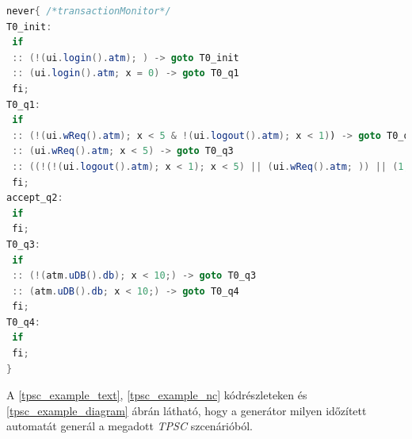 \begin{lstlisting}[language=java,frame=single, float=h!, caption={Generált időzített automata never claim formátumban.},captionpos=b,label=tpsc_example_nc]
never{ /*transactionMonitor*/
T0_init:
 if
 :: (!(ui.login().atm); ) -> goto T0_init
 :: (ui.login().atm; x = 0) -> goto T0_q1
 fi;
T0_q1:
 if
 :: (!(ui.wReq().atm); x < 5 & !(ui.logout().atm); x < 1)) -> goto T0_q1
 :: (ui.wReq().atm; x < 5) -> goto T0_q3
 :: ((!(!(ui.logout().atm); x < 1); x < 5) || (ui.wReq().atm; )) || (1, x >= 5))) -> goto accept_q2
 fi;
accept_q2:
 if
 fi;
T0_q3:
 if
 :: (!(atm.uDB().db); x < 10;) -> goto T0_q3
 :: (atm.uDB().db; x < 10;) -> goto T0_q4
 fi;
T0_q4:
 if
 fi;
}
\end{lstlisting}

A \ref{tpsc_example_text}, \ref{tpsc_example_nc} kódrészleteken és \ref{tpsc_example_diagram} ábrán látható, hogy a generátor milyen időzített automatát generál a megadott \textit{TPSC} szcenárióból.